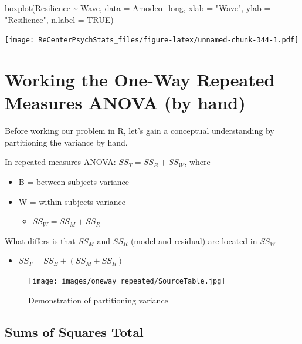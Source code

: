 \documentclass[
  11pt,
]{book}
\newenvironment{Shaded}{\begin{snugshade}}{\end{snugshade}}
\newcommand{\AttributeTok}[1]{\textcolor[rgb]{0.77,0.63,0.00}{#1}}
\newcommand{\ConstantTok}[1]{\textcolor[rgb]{0.00,0.00,0.00}{#1}}
\newcommand{\FunctionTok}[1]{\textcolor[rgb]{0.00,0.00,0.00}{#1}}
\newcommand{\NormalTok}[1]{#1}
\newcommand{\SpecialCharTok}[1]{\textcolor[rgb]{0.00,0.00,0.00}{#1}}
\newcommand{\StringTok}[1]{\textcolor[rgb]{0.31,0.60,0.02}{#1}}
\providecommand{\tightlist}{%
  \setlength{\itemsep}{0pt}\setlength{\parskip}{0pt}}
\begin{document}
\begin{Shaded}
\begin{Highlighting}[]
\FunctionTok{boxplot}\NormalTok{(Resilience }\SpecialCharTok{\textasciitilde{}}\NormalTok{ Wave, }\AttributeTok{data =}\NormalTok{ Amodeo\_long, }\AttributeTok{xlab =} \StringTok{"Wave"}\NormalTok{, }\AttributeTok{ylab =} \StringTok{"Resilience"}\NormalTok{,}
    \AttributeTok{n.label =} \ConstantTok{TRUE}\NormalTok{)}
\end{Highlighting}
\end{Shaded}

\texttt{[image: ReCenterPsychStats\_files/figure-latex/unnamed-chunk-344-1.pdf]}

\hypertarget{working-the-one-way-repeated-measures-anova-by-hand}{%
\section{Working the One-Way Repeated Measures ANOVA (by hand)}\label{working-the-one-way-repeated-measures-anova-by-hand}}

Before working our problem in R, let's gain a conceptual understanding by partitioning the variance by hand.

In repeated measures ANOVA: \(SS_T = SS_B + SS_W\), where

\begin{itemize}
\tightlist
\item
  B = between-subjects variance
\item
  W = within-subjects variance

  \begin{itemize}
  \tightlist
  \item
    \(SS_W = SS_M + SS_R\)
  \end{itemize}
\end{itemize}

What differs is that \(SS_M\) and \(SS_R\) (model and residual) are located in \(SS_W\)

\begin{itemize}
\tightlist
\item
  \(SS_T = SS_B + (SS_M + SS_R)\)
\end{itemize}

\begin{figure}
\centering
\texttt{[image: images/oneway\_repeated/SourceTable.jpg]}
\caption{Demonstration of partitioning variance}
\end{figure}

\hypertarget{sums-of-squares-total-2}{%
\subsection{Sums of Squares Total}\label{sums-of-squares-total-2}}
\end{document}
